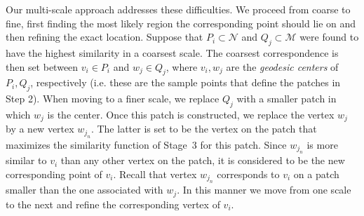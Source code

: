 Our multi-scale approach addresses these difficulties.
We proceed from coarse to fine, first finding the most likely region the corresponding point should lie on and then refining the exact location.
Suppose that $P_i \subset \mathcal{N}$ and $Q_j\subset \mathcal{M}$ were found to have the highest similarity in a coarsest scale.
The coarsest correspondence is then set between $v_i \in P_i$ and $w_j \in Q_j$, where $v_i, w_j$ are the {\em geodesic centers} of  $P_i, Q_j$, respectively (i.e. these are the sample points that define the patches in Step 2).
When moving to a finer scale, we replace  $Q_j$ with a smaller patch in which $w_j$ is the center.
Once this patch is constructed, we replace the vertex $w_j$ by a new vertex $w_{j_n}$.
The latter is set to be the vertex on the patch that maximizes the similarity function of Stage~3 for this patch.
Since $w_{j_n}$ is more similar to $v_i$ than any other vertex on the patch, it is considered to be the new corresponding point of $v_i$.
Recall that vertex $w_{j_n}$ corresponds to $v_i$ on a patch smaller than the one associated with $w_j$.
In this manner we move from one scale to the next and refine the corresponding vertex of $v_i$.

